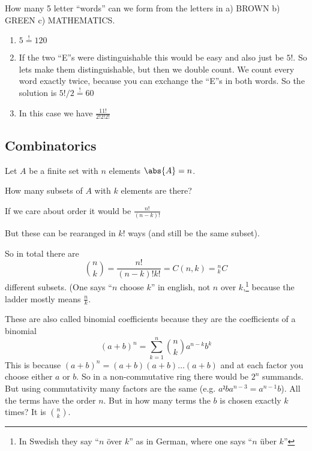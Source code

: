 \documentclass[english]{lbscript}
\begin{document}
\begin{example}{How many 5 letter ``words'' can we form from the letters in a) BROWN b) GREEN c) MATHEMATICS.}{}
  \begin{enumerate}[label=\alph{*})]
    \item\label{item:1} \(5\overset{!}{=}120\)
    \item\label{item:2} If the two ``E''s were distinguishable this would be easy and also just be \(5!\). So lets make them distinguishable, but then we double count. We count every word exactly twice, because you can exchange the ``E''s in both words. So the solution is \(5!/2\overset{!}{=}60\)
    \item\label{item:3} In this case we have \(\frac{11!}{2!2!2!}\)
  \end{enumerate}
\end{example}

\subsection{Combinatorics}
\label{sec:combinatorics}

Let \(A\) be a finite set with \(n\) elements \(\abs{A}=n\).

How many subsets of \(A\) with \(k\) elements are there?

If we care about order it would be \(\frac{n!}{(n-k)!}\)

But these can be rearanged in \(k!\) ways (and still be the same subset).

So in total there are
\begin{equation}
  \label{eq:1}
  \binom{n}{k} = \frac{n!}{(n-k)!k!} = C(n, k) = {}^{n}_{k}C
\end{equation}
different subsets. (One says \enquote{\(n\) choose \(k\)} in english, not \(n\) over \(k\),\footnote{In Swedish they say \enquote{\(n\) över \(k\)} as in German, where one says \enquote{\(n\) über \(k\)}} because the ladder mostly means \(\frac{n}{k}\).

These are also called binomial coefficients because they are the coefficients of a binomial
\begin{equation}
  \label{eq:2}
  (a+b)^{n} = ∑_{k=1}^{n} \binom{n}{k} a^{n-k} b^{k}
\end{equation}
This is because \((a+b)^{n}=(a+b)(a+b)\dots(a+b)\) and at each factor you choose either \(a\) or \(b\). So in a non-commutative ring there would be \(2^{n}\) summands. But using commutativity many factors are the same (e.g. \(a²ba^{n-3}=a^{n-1}b\)). All the terms have the order \(n\). But in how many terms the \(b\) is chosen exactly \(k\) times? It is \(\binom{n}{k}\).
\end{document}
